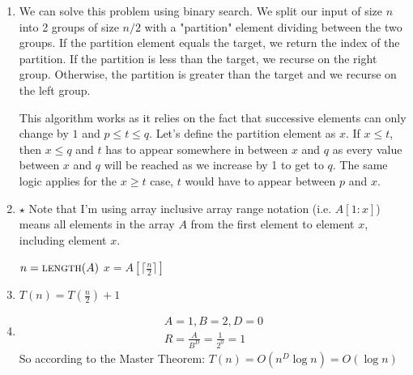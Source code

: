 \documentclass{article}
\begin{document}
\begin{enumerate}
    \item 
        We can solve this problem using binary search.
        We split our input of size $n$ into 2 groups of size $n/2$ with a "partition" element dividing between the two groups.
        If the partition element equals the target, we return the index of the partition.
        If the partition is less than the target, we recurse on the right group. Otherwise, the partition is greater than the target and we recurse on the left group.

        This algorithm works as it relies on the fact that successive elements can only change by $1$ and $p \leq t \leq q$.
        Let's define the partition element as $x$. If $x \leq t$, then $x \leq q$ and $t$ has to appear somewhere in between $x$ and $q$ as every value between $x$ and $q$ will be reached as we increase by 1 to get to $q$.
        The same logic applies for the $x \geq t$ case, $t$ would have to appear between $p$ and $x$.   
    \item 
        $\star$ Note that I'm using array inclusive array range notation 
        (i.e. $A[1:x]$) means all elements in the array $A$ from the first element to element $x$, including element $x$.
        \begin{algorithmic}
                \State $n = \Call{length}{A}$
                \State $x = A[\lceil \frac{n}{2} \rceil]$
                \Else

                \EndIf
            \EndFunction
        \end{algorithmic}

    \item $T(n) = T(\frac{n}{2}) + 1$
    \item 
        \begin{align*}
            A = 1, B = 2, D = 0 \\
            R = \frac{A}{B^D} = \frac{1}{2^0} = 1
        \end{align*}
        So according to the Master Theorem: $T(n) = O(n^D\log n) = O(\log n)$
    
\end{enumerate}

\newpage
\end{document}

